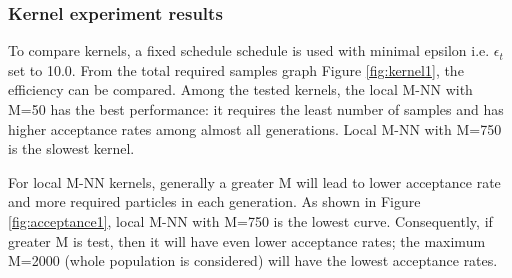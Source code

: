 \documentclass[12pt,a4paper]{report}
\begin{document}
\subsubsection{Kernel experiment results}

To compare kernels, a fixed schedule schedule is used with minimal epsilon i.e. $\epsilon_t$ set to 10.0. From the total required samples graph Figure \ref{fig:kernel1}, the efficiency can be compared. Among the tested kernels, the local M-NN with M=50 has the best performance: it requires the least number of samples and 
has higher acceptance rates among almost all generations. Local M-NN with M=750 is the slowest kernel.

For local M-NN kernels, generally a greater M will lead to lower acceptance rate and 
more required particles in each generation. As shown in Figure \ref{fig:acceptance1}, local M-NN with M=750 is the lowest curve. Consequently, if greater M is test, then it will have even lower acceptance rates; the maximum M=2000 (whole population is considered) will have the lowest acceptance rates.
\end{document}
